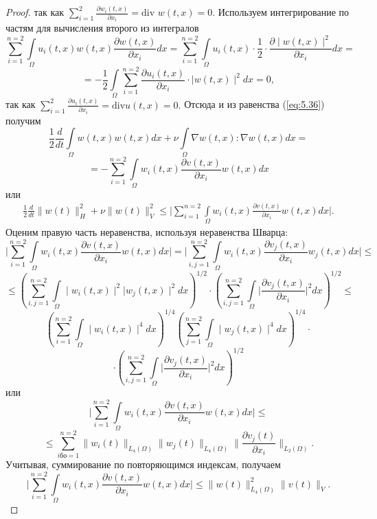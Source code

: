 \begin{proof}
    так как $\sum\limits_{i=1}^{2}\frac{\partial w_i(t, x)}{\partial x_i} = \textrm{div } w(t, x)=0$.
    Используем интегрирование по частям для вычисления второго из интегралов
    $$\sum_{i=1}^{n=2}\int\limits_\Omega u_i(t,x)w(t, x)\frac{\partial w(t, x)}{\partial x_i}dx=
    \sum_{i=1}^{n=2}\int\limits_\Omega u_i(t,x)\cdot\frac{1}{2}\cdot\frac{\partial \mid w(t, x)\mid^2}{\partial x_i}dx=$$
    $$=-\frac{1}{2}\int\limits_\Omega\sum_{i=1}^{n=2}\frac{\partial u_i(t, x)}{\partial x_i}\cdot\mid w(t, x)\mid^2dx=0,$$
    так как $\sum\limits_{i=1}^{2}\frac{\partial u_i(t, x)}{\partial x_i} = \textrm{div} u(t, x)=0.$
    Отсюда и из равенства (\ref{eq:5.36}) получим
    $$\frac{1}{2}\frac{d}{dt}\int\limits_\Omega w(t, x)w(t, x)dx+\nu\int\limits_{\Omega}\nabla w(t,x):\nabla w(t,x)dx=$$
    $$=-\sum_{i=1}^{n=2}\int\limits_\Omega w_i(t, x)\frac{\partial v(t, x)}{\partial x_i}w(t, x)dx$$
    или
    \begin{equation}\label{eq:5.37}
        \begin{gathered}
            \frac{1}{2}\frac{d}{dt}\| w(t)\|_H^2+\nu\| w(t)\|_V^2\le
            \bigg|\sum_{i=1}^{n=2}\int\limits_\Omega w_i(t, x)\frac{\partial v(t, x)}{\partial x_i}w(t, x)dx\bigg|.
        \end{gathered}
    \end{equation}
    Оценим правую часть неравенства, используя неравенства Шварца:
    $$\bigg|\sum_{i=1}^{n=2}\int\limits_\Omega w_i(t, x)\frac{\partial v(t, x)}{\partial x_i}w(t, x)dx\bigg|=
    \bigg|\sum_{i,j=1}^{n=2}\int\limits_\Omega w_i(t, x)\frac{\partial v_j(t, x)}{\partial x_i}w_j(t, x)dx\bigg|\le$$
    $$\le\left(\sum_{i,j=1}^{n=2}\int\limits_\Omega \mid w_i(t, x)\mid^2|w_j(t, x)\mid^2dx \right)^{1/2}
    \cdot\left(\sum_{i,j=1}^{n=2}\int\limits_\Omega\bigg|\frac{\partial v_j(t, x)}{\partial x_i}\bigg|^2dx \right)^{1/2}\le$$
    $$\left(\sum_{i=1}^{n=2}\int\limits_\Omega \mid w_i(t, x)\mid^4dx\right)^{1/4}\left(\sum_{j=1}^{n=2}\int\limits_\Omega \mid w_j(t, x)\mid^4dx\right)^{1/4}\cdot$$
    $$\cdot\left(\sum_{i,j=1}^{n=2}\int\limits_\Omega\bigg|\frac{\partial v_j(t, x)}{\partial x_i} \bigg|^2dx \right)^{1/2}$$
    или
    $$\bigg|\sum_{i=1}^{n=2}\int\limits_\Omega w_i(t, x)\frac{\partial v(t, x)}{\partial x_i}w(t, x)dx\bigg|\le$$
    $$\le\sum_{iбо=1}^{n=2}\| w_i(t)\|_{L_4(\Omega)}\| w_j(t)\|_{L_4(\Omega)}\|\frac{\partial v_j(t)}{\partial x_i}\|_{L_2(\Omega)}.$$
    Учитывая, суммирование по повторяющимся индексам, получаем
    $$\bigg|\sum_{i=1}^{n=2}\int\limits_\Omega w_i(t, x)\frac{\partial v(t, x)}{\partial x_i}w(t, x)dx\bigg|\le\| w(t)\|_{L_4(\Omega)}^2\| v(t)\|_V.$$

\end{proof}

